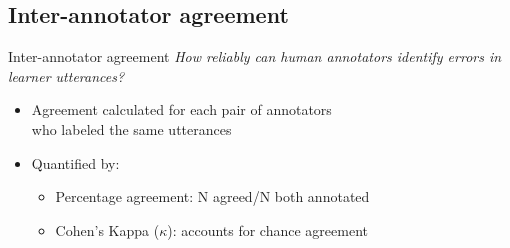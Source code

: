 \documentclass[xcolor={dvipsnames}]{beamer}
\newcommand{\TODO}[1]{{\color{red}\textbf{[TODO #1]}}}
\begin{document}
	\subsection{Inter-annotator agreement}
		\begin{frame}{Inter-annotator agreement}
		\textit{How reliably can human annotators identify errors in learner utterances?}
		\vspace{1em}
		\begin{itemize}
		\item Agreement calculated for each pair of annotators \\who labeled the same utterances
		\item Quantified by:
			\begin{itemize}
			\item Percentage agreement: N agreed/N both annotated
			\item Cohen's Kappa ($\kappa$): accounts for chance agreement
			\end{itemize}
		\end{itemize}
		
		\end{frame}
		
\end{document}
